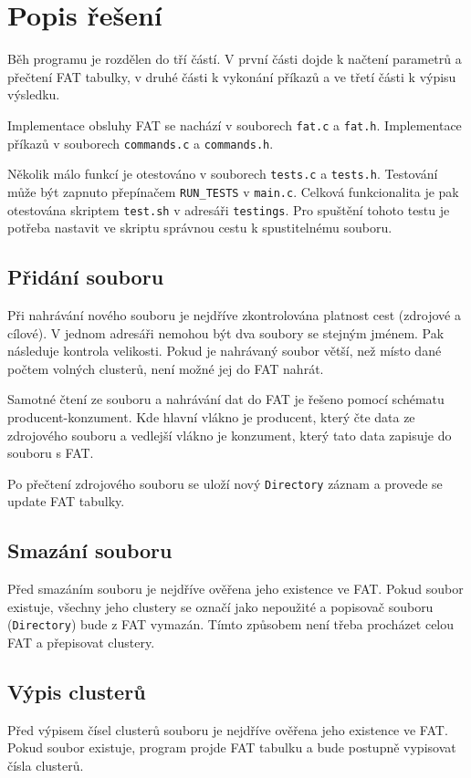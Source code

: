 \documentclass[11pt,a4paper]{scrartcl}
\begin{document}
	\section{Popis řešení}
	Běh programu je rozdělen do tří částí. V první části dojde k načtení parametrů a přečtení FAT tabulky, v druhé části k vykonání příkazů a ve třetí části k výpisu výsledku.
	
	Implementace obsluhy FAT se nachází v souborech \verb|fat.c| a \verb|fat.h|. Implementace příkazů v souborech \verb|commands.c| a \verb|commands.h|.
	
	Několik málo funkcí je otestováno v souborech \verb|tests.c| a \verb|tests.h|. Testování může být zapnuto přepínačem \verb|RUN_TESTS| v \verb|main.c|. Celková funkcionalita je pak otestována skriptem \verb|test.sh| v adresáři \verb|testings|. Pro spuštění tohoto testu je potřeba nastavit ve skriptu správnou cestu k spustitelnému souboru.
	
	\subsection{Přidání souboru}
	Při nahrávání nového souboru je nejdříve zkontrolována platnost cest (zdrojové a cílové). V jednom adresáři nemohou být dva soubory se stejným jménem. Pak následuje kontrola velikosti. Pokud je nahrávaný soubor větší, než místo dané počtem volných clusterů, není možné jej do FAT nahrát.
	
	Samotné čtení ze souboru a nahrávání dat do FAT je řešeno pomocí schématu producent-konzument. Kde hlavní vlákno je producent, který čte data ze zdrojového souboru a vedlejší vlákno je konzument, který tato data zapisuje do souboru s FAT.
	
	Po přečtení zdrojového souboru se uloží nový \verb|Directory| záznam a provede se update FAT tabulky.
	
	\subsection{Smazání souboru}
	Před smazáním souboru je nejdříve ověřena jeho existence ve FAT. Pokud soubor existuje, všechny jeho clustery se označí jako nepoužité a popisovač souboru (\verb|Directory|) bude z FAT vymazán. Tímto způsobem není třeba procházet celou FAT a přepisovat clustery.
	
	\subsection{Výpis clusterů}
	Před výpisem čísel clusterů souboru je nejdříve ověřena jeho existence ve FAT. Pokud soubor existuje, program projde FAT tabulku a bude postupně vypisovat čísla clusterů.
	
\end{document}
